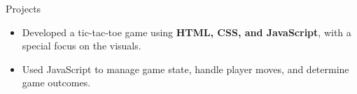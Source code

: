 \documentclass{resume} %
\begin{document}
\begin{workSection}{Projects}
         \customItem[
         title=\href{https://github.com/AshkanArabim/tic-tac-toe}{Tic Tac Toe Web App \faExternalLink},
         duration=Fall 2022,
         ]
         \begin{itemize}
             \vspace{-0.5em}
             \itemsep -6pt {}
             \item Developed a tic-tac-toe game using \textbf{HTML, CSS, and JavaScript}, with a special focus on the visuals.
             \item Used JavaScript to manage game state, handle player moves, and determine game outcomes.
         \end{itemize}


    

\end{workSection}
\end{document}
